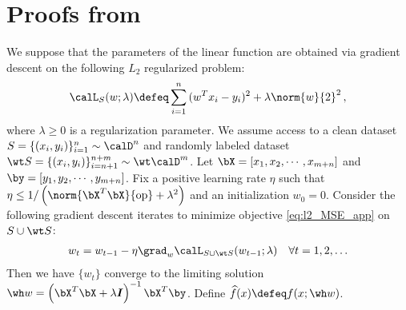\newpage
\section{Proofs from }\label{app:proof_gd}
We suppose that the parameters of the linear function 
are obtained via gradient descent on 
the following $L_2$ regularized problem: 
\begin{align}
    \calL_S(w; \lambda) \defeq \sum_{i=1}^n{(w^Tx_i - y_i)^2} + \lambda \norm{w}{2}^2 \,, \label{eq:l2_MSE_app}   
\end{align}
where $\lambda\ge0$ is a regularization parameter. 
We assume access to a clean dataset 
$S = \{(x_i, y_i)\}_{i=1}^n \sim \calD^n$ 
and randomly labeled dataset 
$\wt S = \{(x_i, y_i)\}_{i=n+1}^{n+m} \sim \wt \calD^m$. 
Let $\bX = [x_1, x_2, \cdots, x_{m+n}]$ 
and $\by = [y_1, y_2, \cdots, y_{m+n}]$. 
Fix a positive learning rate $\eta$ such that 
$\eta \le 1/\left(\norm{\bX^T\bX}{\text{op}} + \lambda^2\right)$ 
and an initialization $w_0 = 0$. 
Consider the following gradient descent iterates 
to minimize objective \eqref{eq:l2_MSE_app} on $S \cup \wt S$:
\begin{align}
w_t = w_{t-1} - \eta \grad_w \calL_{S \cup \wt S} (w_{t-1}; \lambda) \quad \forall t=1,2,\ldots \label{eq:GD_iterates_app}
\end{align} 
Then we have $\{ w_t\}$ converge to the limiting solution 
$\wh w = \left( \bX^T\bX+\lambda \boldsymbol{I}\right)^{-1}\bX^T\by$. Define $\widehat f (x) \defeq f(x ; \wh w) $.  




